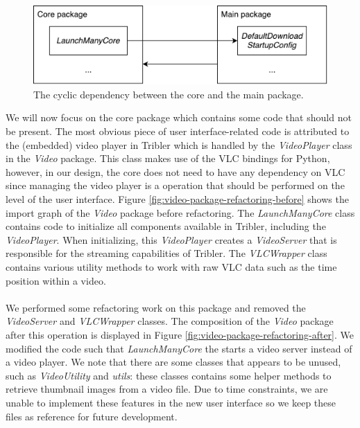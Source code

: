 \begin{figure}[h!]
	\centering
	\includegraphics[width=0.6\columnwidth]{images/implementation/cycle_main_core}
	\caption{The cyclic dependency between the core and the main package.}
	\label{fig:cycle-main-core}
\end{figure}

We will now focus on the core package which contains some code that should not be present. The most obvious piece of user interface-related code is attributed to the (embedded) video player in Tribler which is handled by the \emph{VideoPlayer} class in the \emph{Video} package. This class makes use of the VLC bindings for Python, however, in our design, the core does not need to have any dependency on VLC since managing the video player is a operation that should be performed on the level of the user interface. Figure \ref{fig:video-package-refactoring-before} shows the import graph of the  \emph{Video} package before refactoring. The \emph{LaunchManyCore} class contains code to initialize all components available in Tribler, including the \emph{VideoPlayer}. When initializing, this \emph{VideoPlayer} creates a \emph{VideoServer} that is responsible for the streaming capabilities of Tribler. The \emph{VLCWrapper} class contains various utility methods to work with raw VLC data such as the time position within a video.\\\\
We performed some refactoring work on this package and removed the \emph{VideoServer} and \emph{VLCWrapper} classes. The composition of the \emph{Video} package after this operation is displayed in Figure \ref{fig:video-package-refactoring-after}. We modified the code such that \emph{LaunchManyCore} the starts a video server instead of a video player. We note that there are some classes that appears to be unused, such as \emph{VideoUtility} and \emph{utils}: these classes contains some helper methods to retrieve thumbnail images from a video file. Due to time constraints, we are unable to implement these features in the new user interface so we keep these files as reference for future development.

